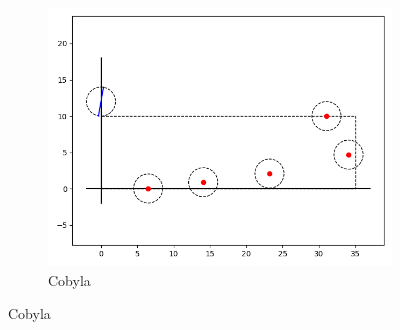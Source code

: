 \documentclass[12pt]{article}
\begin{document}
\begin{figure}
\begin{subfigure}{.33\textwidth}
    \includegraphics[width=\textwidth]{cobyla-layout.png}
    \caption{Cobyla}
\end{subfigure}


\end{figure}
\end{document}
